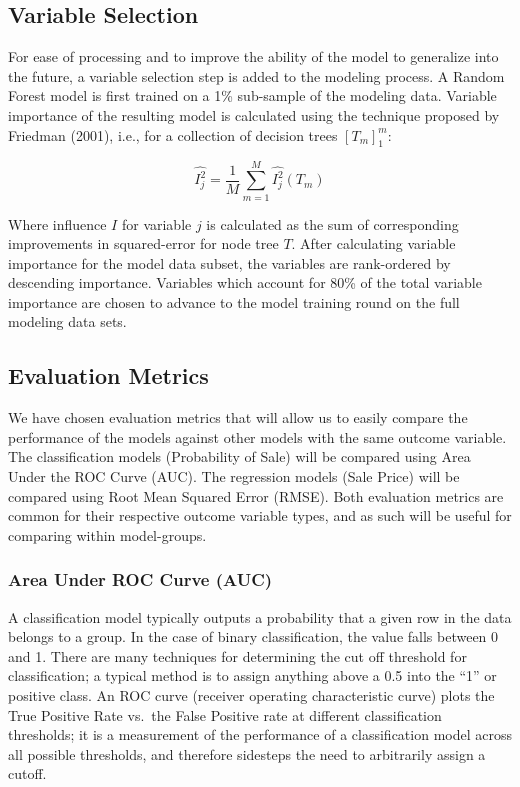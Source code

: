 \documentclass[12pt,]{article}
\begin{document}
\hypertarget{variable-selection}{%
\subsection{Variable Selection}\label{variable-selection}}

For ease of processing and to improve the ability of the model to
generalize into the future, a variable selection step is added to the
modeling process. A Random Forest model is first trained on a 1\%
sub-sample of the modeling data. Variable importance of the resulting
model is calculated using the technique proposed by Friedman (2001),
i.e., for a collection of decision trees \([T_m]_{1}^{m}\):

\[
  \hat{I_{j}^{2}} = \frac{1}{M} \sum_{m=1}^{M}\hat{I_{j}^{2}}(T_m)
\]

Where influence \(I\) for variable \(j\) is calculated as the sum of
corresponding improvements in squared-error for node tree \(T\). After
calculating variable importance for the model data subset, the variables
are rank-ordered by descending importance. Variables which account for
80\% of the total variable importance are chosen to advance to the model
training round on the full modeling data sets.

\hypertarget{evaluation-metrics}{%
\subsection{Evaluation Metrics}\label{evaluation-metrics}}

We have chosen evaluation metrics that will allow us to easily compare
the performance of the models against other models with the same outcome
variable. The classification models (Probability of Sale) will be
compared using Area Under the ROC Curve (AUC). The regression models
(Sale Price) will be compared using Root Mean Squared Error (RMSE). Both
evaluation metrics are common for their respective outcome variable
types, and as such will be useful for comparing within model-groups.

\hypertarget{area-under-roc-curve-auc}{%
\subsubsection{Area Under ROC Curve
(AUC)}\label{area-under-roc-curve-auc}}

A classification model typically outputs a probability that a given row
in the data belongs to a group. In the case of binary classification,
the value falls between 0 and 1. There are many techniques for
determining the cut off threshold for classification; a typical method
is to assign anything above a 0.5 into the ``1'' or positive class. An
ROC curve (receiver operating characteristic curve) plots the True
Positive Rate vs.~the False Positive rate at different classification
thresholds; it is a measurement of the performance of a classification
model across all possible thresholds, and therefore sidesteps the need
to arbitrarily assign a cutoff.
\end{document}
